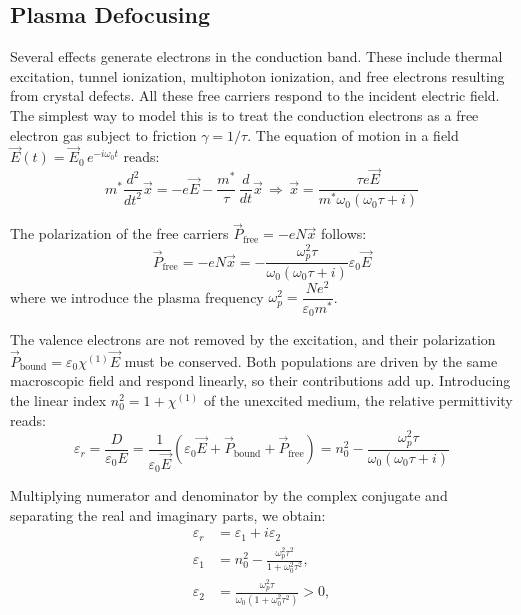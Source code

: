 \subsection{Plasma Defocusing}

Several effects generate electrons in the conduction band. These include thermal excitation, tunnel ionization, multiphoton ionization, and free electrons resulting from crystal defects. All these free carriers respond to the incident electric field. The simplest way to model this is to treat the conduction electrons as a free electron gas subject to friction $\gamma = 1/\tau$. The equation of motion in a field $\vec{E}(t) = \vec{E}_0\, e^{-i\omega_0 t}$ reads:
\begin{equation}
  m^\ast \frac{d^2}{dt^2}\vec{x} = -e\vec{E} - \frac{m^\ast}{\tau}\, \frac{d}{dt}\vec{x}
  \,\Longrightarrow\,
  \vec{x} = \frac{\tau e\vec{E}}{m^\ast \omega_0\left(\omega_0\tau + i\right)}
\end{equation}

The polarization of the free carriers $\vec{P}_{\mathrm{free}} = -eN\vec{x}$ follows:
\begin{equation}
  \vec{P}_{\mathrm{free}} = -eN\vec{x} = -\frac{\omega_p^2\tau}{ \omega_0\left(\omega_0\tau + i\right)}\varepsilon_0\vec{E}
\end{equation}
where we introduce the plasma frequency $\omega_p^2 = \dfrac{Ne^2}{\varepsilon_0 m^\ast}$.

The valence electrons are not removed by the excitation, and their polarization $\vec{P}_{\mathrm{bound}} = \varepsilon_0 \chi^{(1)} \vec{E}$ must be conserved. Both populations are driven by the same macroscopic field and respond linearly, so their contributions add up. Introducing the linear index $n_0^2 = 1 + \chi^{(1)}$ of the unexcited medium, the relative permittivity reads:
\begin{equation}
  \varepsilon_r = \frac{D}{\varepsilon_0 E} = \frac{1}{\varepsilon_0\vec{E}}\left(\varepsilon_0 \vec{E} + \vec{P}_{\mathrm{bound}} + \vec{P}_{\mathrm{free}}\right) =  n_0^2 - \frac{\omega_p^2\tau}{\omega_0(\omega_0\tau + i)}
\end{equation}

Multiplying numerator and denominator by the complex conjugate and separating the real and imaginary parts, we obtain:
\begin{align}
\varepsilon_r &= \varepsilon_1 + i\varepsilon_2 \\
  \varepsilon_1 &= n_0^2 - \frac{\omega_p^2\tau^2}{1 + \omega_0^2\tau^2} , \\
  \varepsilon_2 &= \frac{\omega_p^2\tau}{\omega_0\left(1 + \omega_0^2\tau^2\right)} > 0 ,
\end{align}

